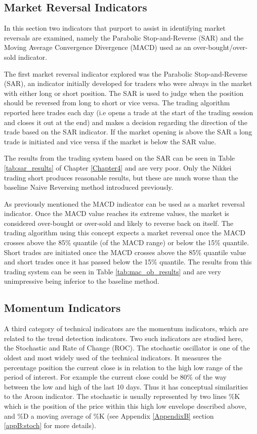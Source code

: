 \subsection{Market Reversal Indicators}
In this section two indicators that purport to assist in identifying market reversals are examined, namely the Parabolic Stop-and-Reverse (SAR) and the Moving Average Convergence Divergence (MACD) used as an over-bought/over-sold indicator. 

The first market reversal indicator explored was the Parabolic Stop-and-Reverse (SAR), an indicator initially developed for traders who were always in the market with either long or short position. The SAR is used to judge when the  position should be reversed from long to short or vice versa. The trading algorithm reported here trades each day (i.e opens a trade at the start of the trading session and closes it out at the end) and makes a decision regarding the direction of the trade based on the SAR indicator. If the market opening is above the SAR a long trade is initiated and vice versa if the market is below the SAR value.

The results from the trading system based on the SAR can be seen in Table \ref{tab:sar_results} of Chapter \ref{Chapter4} and are very poor. Only the Nikkei trading short produces reasonable results, but these are much worse than the baseline Naive Reversing method introduced previously.

As previously mentioned the MACD indicator can be used as a market reversal indicator. Once the MACD value reaches its extreme values, the market is considered over-bought or over-sold and likely to reverse back on itself. The trading algorithm using this concept expects a market reversal once the MACD crosses above the 85\% quantile (of the MACD range) or below the 15\% quantile. Short trades are initiated once the MACD crosses above the 85\% quantile value and short trades once it has passed below the 15\% quantile. The results from this trading system can be seen in Table \ref{tab:mac_ob_results} and are very unimpressive being inferior to the baseline method.

\subsection{Momentum Indicators}
A third category of technical indicators are the momentum indicators, which are related to the trend detection indicators. Two such indicators are studied here, the Stochastic and Rate of Change (ROC). The stochastic oscillator is one of the oldest and most widely used of the technical indicators. It measures the percentage position the current close is in relation to the high low range of the period of interest. For example the current close could be 80\% of the way between the low and high of the last 10 days. Thus it has conceptual similarities to the Aroon indicator. The stochastic is usually represented by two lines \%K which is the position of the price within this high low envelope described above, and \%D a moving average of \%K (see Appendix \ref{AppendixB} section \ref{appB:stoch} for more details). 

